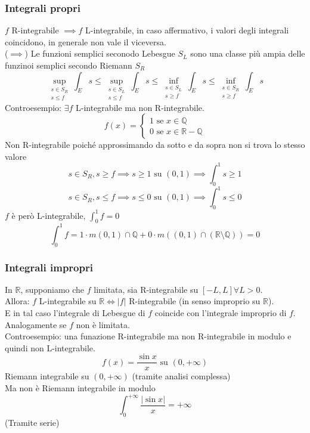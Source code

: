 \documentclass[a4paper]{article}
\newcommand{\R}{\mathbb{R}}
\newcommand{\Q}{\mathbb{Q}}
\begin{document}
\subsubsection{Integrali propri}
$f$ R-integrabile $\implies f$ L-integrabile, in caso affermativo, i valori degli integrali coincidono, in generale non vale il viceversa.
\\($\implies$) Le funzioni semplici seconodo Lebesgue $S_L$ sono una classe più ampia delle funzinoi semplici secondo Riemann $S_R$
\[\sup_{\substack{s\in S_R\\s\le f}}\int_{E}^{}s\le \sup_{\substack{s\in S_L\\s\le f}}\int_{E}^{} s \le \inf_{\substack{s \in S_L\\s\ge f}}\int_{E}^{}  s\le   \inf_{\substack{s\in S_R\\s\ge f}}\int_{E}^{}s\]
Controesempio: $\exists f$ L-integrabile ma non R-integrabile.
\[f(x)=\begin{cases}
	1\text{ se }x\in\Q\\
	0\text{ se }x\in \R-\Q
\end{cases}\]
Non R-integrabile poiché approssimando da sotto e da sopra non si trova lo stesso valore
\[s\in S_R,s\ge f\implies s\ge 1\text{ su }(0,1)\implies \int_{0}^{1} s\ge 1\]
\[s\in S_R, s\le f\implies s\le 0\text{ su }(0,1)\implies \int_{0}^{1} s\le 0\]
$f$ è però L-integrabile, $\int_{0}^{1} f=0$
\[\int_{0}^{1} f=1\cdot m(0,1)\cap\Q+0\cdot m((0,1)\cap(\R\setminus\Q))=0\]
\subsubsection{Integrali impropri}
In $\R$, supponiamo che $f$ limitata, sia R-integrabile su $[-L,L]\forall L>0$.
\\Allora: $f$ L-integrabile su $\R \iff|f|$ R-integrabile (in senso improprio su $\R$).
\\E in tal caso l'integrale di Lebesgue di $f$ coincide con l'integrale improprio di $f$.
\\Analogamente se $f$ non è limitata.
\\Controesempio: una funazione R-integrabile ma non R-integrabile in modulo e quindi non L-integrabile.
\[f(x)= \frac{\sin x}{x}\text{  su }(0,+\infty)\]
Riemann integrabile su $(0,+\infty)$ (tramite analisi complessa)
\\Ma non è Riemann integrabile in modulo
\[\int_{0}^{+\infty} \frac{|\sin x|}{x}=+\infty\]
(Tramite serie)
\end{document}
